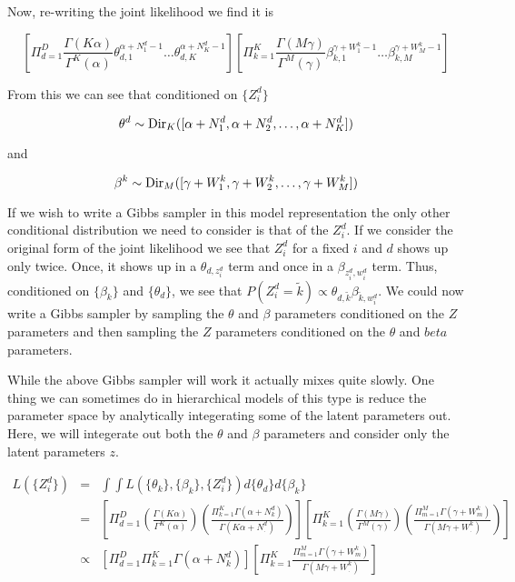 \documentclass[11pt]{amsart}
\begin{document}
Now, re-writing the joint likelihood we find it is

$$ \left[\Pi_{d = 1}^D \frac{\Gamma(K\alpha)}{\Gamma^K(\alpha)} \theta_{d,1}^{\alpha + N^d_1 -1} \ldots \theta_{d,K}^{\alpha + N_K^d - 1} \right] \left[ \Pi_{k = 1}^K \frac{\Gamma(M\gamma)}{\Gamma^M(\gamma)} \beta_{k,1}^{\gamma + W_1^k -1} \ldots \beta_{k,M}^{\gamma + W_M^k -1} \right]$$

From this we can see that conditioned on $\{ Z_i^d \}$

$$\theta^d \sim {\rm Dir}_K([\alpha + N_1^d, \alpha + N_2^d, \ldots, \alpha + N_K^d])$$

and

$$ \beta^k \sim {\rm Dir}_M([\gamma + W_1^k, \gamma + W_2^k, \ldots, \gamma + W_M^k])$$

\noindent  If we wish to write a Gibbs sampler in this model representation the only other conditional distribution we need to consider is that of the $Z_i^d$.  If we consider the original form of the joint likelihood we see that $Z_i^d$ for a fixed $i$ and $d$ shows up only twice.  Once, it shows up in a $\theta_{d,z^d_i}$ term and once in a $\beta_{z_i^d,w^d_i}$ term.  Thus, conditioned on $\{\beta_k \}$ and $\{\theta_d \}$, we see that $P(Z_i^d = \tilde k) \propto \theta_{d,\tilde k} \beta_{\tilde k, w_i^d}$. We could now write a Gibbs sampler by sampling the $\theta$ and $\beta$ parameters conditioned on the $Z$ parameters and then sampling the $Z$ parameters conditioned on the $\theta$ and $beta$ parameters.

While the above Gibbs sampler will work it actually mixes quite slowly.  One thing we can sometimes do in hierarchical models of this type is reduce the parameter space by analytically integerating some of the latent parameters out.  Here, we will integerate out both the $\theta$ and $\beta$ parameters and consider only the latent parameters $z$.

\begin{eqnarray*}
L(\{Z_i^d\}) &=& \int \int L(\{\theta_k\}, \{\beta_k\}, \{Z_i^d\}) d\{\theta_d\} d\{\beta_k\}\\ 
&=& \left[ \Pi_{d = 1}^D \left(\frac{\Gamma(K \alpha)}{\Gamma^K(\alpha)}\right) \left( \frac{\Pi_{k = 1}^K \Gamma(\alpha + N_k^d)}{\Gamma(K \alpha + N_.^d)} \right) \right] \left[ \Pi_{k = 1}^K \left( \frac{\Gamma(M\gamma)}{\Gamma^M(\gamma)} \right)   \left( \frac{\Pi_{m = 1}^M \Gamma(\gamma + W_m^k)}{\Gamma(M \gamma + W_.^k)} \right)  \right]\\
&\propto& \left[ \Pi_{d = 1}^D \Pi_{k = 1}^K \Gamma(\alpha + N_k^d) \right] \left[ \Pi_{k = 1}^K \frac{\Pi_{m = 1}^M \Gamma(\gamma + W_m^k)}{\Gamma(M\gamma + W_.^k)} \right]
\end{eqnarray*}
 
\end{document}
